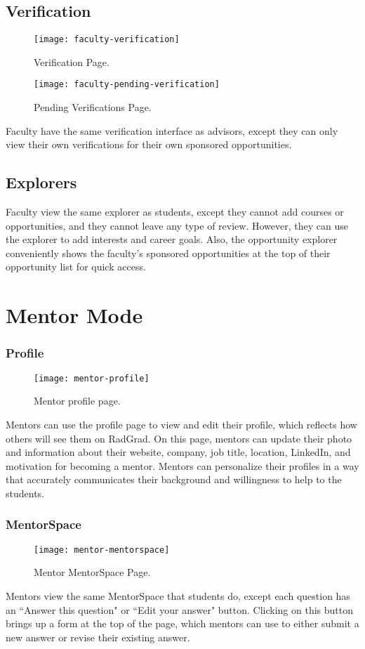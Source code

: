 \subsection{Verification}
\begin{figure}[h]
\centering
\texttt{[image: faculty-verification]}
\caption{Verification Page.}
\end{figure}

\begin{figure}[h]
\centering
\texttt{[image: faculty-pending-verification]}
\caption{Pending Verifications Page.}
\end{figure}
Faculty have the same verification interface as advisors, except they can only view their own verifications for their own sponsored opportunities. 
\subsection{Explorers}
Faculty view the same explorer as students, except they cannot add courses or opportunities, and they cannot leave any type of review. However, they can use the explorer to add interests and career goals. Also, the opportunity explorer conveniently shows the faculty's sponsored opportunities at the top of their opportunity list for quick access.

\section{Mentor Mode}
\subsubsection{Profile}
\begin{figure}[h]
\centering
\texttt{[image: mentor-profile]}
\caption{Mentor profile page.}
\end{figure}
Mentors can use the profile page to view and edit their profile, which reflects how others will see them on RadGrad. On this page, mentors can update their photo and information about their website, company, job title, location, LinkedIn, and motivation for becoming a mentor. Mentors can personalize their profiles in a way that accurately communicates their background and willingness to help to the students. 
\subsubsection{MentorSpace}
\begin{figure}[h]
\centering
\texttt{[image: mentor-mentorspace]}
\caption{Mentor MentorSpace Page.}
\end{figure}
Mentors view the same MentorSpace that students do, except each question has an ``Answer this question" or ``Edit your answer" button. Clicking on this button brings up a form at the top of the page, which mentors can use to either submit a new answer or revise their existing answer. 

